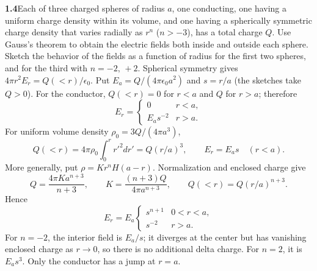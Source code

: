 \par\bigskip
\noindent\textbf{1.4}\quad Each of three charged spheres of radius $a$, one conducting, one having a uniform charge density within its volume, and one having a spherically symmetric charge density that varies radially as $r^{n}$ ($n>-3$), has a total charge $Q$. Use Gauss's theorem to obtain the electric fields both inside and outside each sphere. Sketch the behavior of the fields as a function of radius for the first two spheres, and for the third with $n=-2,\,+2$.
\solution
Spherical symmetry gives $4\pi r^2E_r=Q(<r)/\epsilon_0$. Put
$E_a=Q/(4\pi\epsilon_0a^2)$ and $s=r/a$ (the sketches take $Q>0$).
For the conductor, $Q(<r)=0$ for $r<a$ and $Q$ for $r>a$; therefore
\[
E_r=\begin{cases}0&r<a,\\E_as^{-2}&r>a.\end{cases}
\]
For uniform volume density $\rho_0=3Q/(4\pi a^3)$,
\[
Q(<r)=4\pi\rho_0\int_0^r r'^2dr'=Q(r/a)^3,
\qquad E_r=E_as\quad(r<a).
\]
More generally, put $\rho=Kr^nH(a-r)$. Normalization and enclosed charge give
\[
Q=\frac{4\pi Ka^{n+3}}{n+3},\qquad
K=\frac{(n+3)Q}{4\pi a^{n+3}},\qquad
Q(<r)=Q(r/a)^{n+3}.
\]
Hence
\[
\boxed{E_r=E_a\begin{cases}s^{n+1}&0<r<a,\\s^{-2}&r>a.\end{cases}}
\]
For $n=-2$, the interior field is $E_a/s$; it diverges at the center but has
vanishing enclosed charge as $r\to0$, so there is no additional delta charge.
For $n=2$, it is $E_as^3$. Only the conductor has a jump at $r=a$.
\begin{center}
\end{center}


